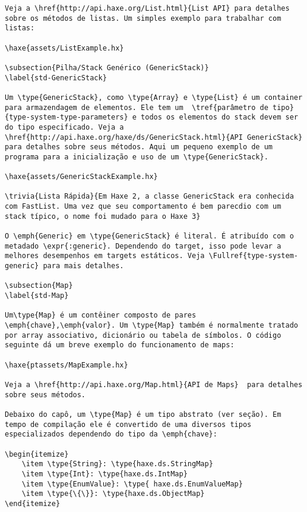 \begin{lstlisting}
Veja a \href{http://api.haxe.org/List.html}{List API} para detalhes sobre os métodos de listas. Um simples exemplo para trabalhar com listas:

\haxe{assets/ListExample.hx}

\subsection{Pilha/Stack Genérico (GenericStack)}
\label{std-GenericStack}

Um \type{GenericStack}, como \type{Array} e \type{List} é um container para armazendagem de elementos. Ele tem um  \tref{parâmetro de tipo}{type-system-type-parameters} e todos os elementos do stack devem ser do tipo especificado. Veja a \href{http://api.haxe.org/haxe/ds/GenericStack.html}{API GenericStack}  para detalhes sobre seus métodos. Aqui um pequeno exemplo de um programa para a inicialização e uso de um \type{GenericStack}.

\haxe{assets/GenericStackExample.hx}

\trivia{Lista Rápida}{Em Haxe 2, a classe GenericStack era conhecida com FastList. Uma vez que seu comportamento é bem parecdio com um stack típico, o nome foi mudado para o Haxe 3}

O \emph{Generic} em \type{GenericStack} é literal. É atribuído com o metadado \expr{:generic}. Dependendo do target, isso pode levar a melhores desempenhos em targets estáticos. Veja \Fullref{type-system-generic} para mais detalhes.

\subsection{Map}
\label{std-Map}

Um\type{Map} é um contêiner composto de pares \emph{chave},\emph{valor}. Um \type{Map} também é normalmente tratado por array associativo, dicionário ou tabela de símbolos. O código seguinte dá um breve exemplo do funcionamento de maps:

\haxe{ptassets/MapExample.hx}

Veja a \href{http://api.haxe.org/Map.html}{API de Maps}  para detalhes sobre seus métodos.

Debaixo do capô, um \type{Map} é um tipo abstrato (ver seção). Em tempo de compilação ele é convertido de uma diversos tipos especializados dependendo do tipo da \emph{chave}:

\begin{itemize}
    \item \type{String}: \type{haxe.ds.StringMap}
    \item \type{Int}: \type{haxe.ds.IntMap}
    \item \type{EnumValue}: \type{ haxe.ds.EnumValueMap}
    \item \type{\{\}}: \type{haxe.ds.ObjectMap}
\end{itemize}


\end{lstlisting}
